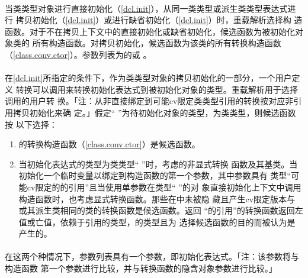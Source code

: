 \paragraph{}
当类类型对象进行直接初始化（\ref{dcl.init}），从同一类类型或派生类类型表达式进行
拷贝初始化（\ref{dcl.init}）或进行缺省初始化（\ref{dcl.init}）时，重载解析选择构
造函数。对于不在拷贝上下文中的直接初始化或缺省初始化，候选函数为被初始化对象类的
所有构造函数。对拷贝初始化，候选函数为该类的所有转换构造函数
（\ref{class.conv.ctor}）。参数列表为的或
。

\paragraph{}
在\ref{dcl.init}所指定的条件下，作为类类型对象的拷贝初始化的一部分，一个用户定义
转换可以调用来转换初始化表达式到被初始化对象的类型。重载解析用于选择调用的用户转
换。「注：从非直接绑定到可能cv限定类类型引用的转换按对应非引用拷贝初始化来确
定。」假定`` ''为待初始化对象的类型，为类类型，则候选函数按
以下选择：
\begin{enumerate}
  \item{的转换构造函数（\ref{class.conv.ctor}）是候选函数。}
  \item{当初始化表达式的类型为类类型`` ''时，考虑的非显式转换
    函数及其基类。当初始化一个临时变量以绑定到构造函数的第一个参数，其中参数具有
    类型``可能cv限定的的引用''且当使用单参数在类型`` ''的对
    象直接初始化上下文中调用构造函数时，也考虑显式转换函数。那些在中未被隐
    藏且产生cv限定版本与或其派生类相同的类的转换函数是候选函数。返回
    ``的引用''的转换函数返回左值或亡值，依赖于引用的类型，的类型且为
    选择候选函数的目的而被认为是产生的。}
\end{enumerate}

\paragraph{}
在这两个种情况下，参数列表具有一个参数，即初始化表达式。「注：该参数将与构造函数
第一个参数进行比较，并与转换函数的隐含对象参数进行比较。」

